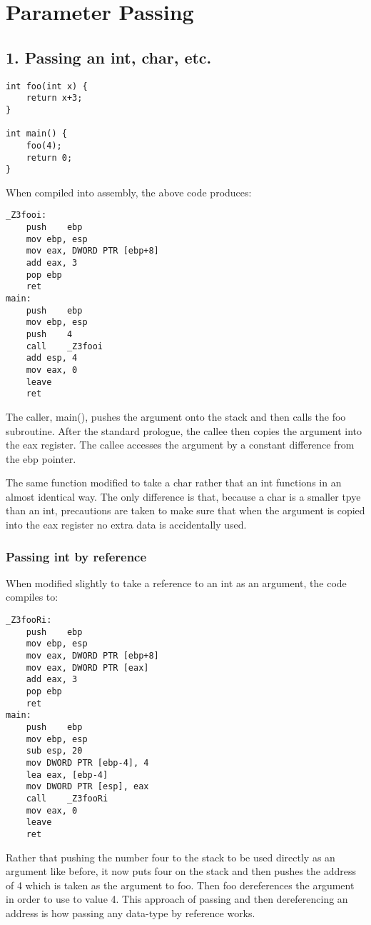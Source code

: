 \documentclass{article}
\begin{document}
\section*{Parameter Passing}
\subsection*{1. Passing an int, char, etc.}
\begin{lstlisting}
int foo(int x) {
    return x+3;
}

int main() {
    foo(4);
    return 0;
}
\end{lstlisting}
When compiled into assembly, the above code produces:
\begin{lstlisting}
_Z3fooi:
	push	ebp
	mov	ebp, esp
	mov	eax, DWORD PTR [ebp+8]
	add	eax, 3
	pop	ebp
	ret
main:
	push	ebp
	mov	ebp, esp
	push	4
	call	_Z3fooi
	add	esp, 4
	mov	eax, 0
	leave
	ret
\end{lstlisting}
The caller, main(), pushes the argument onto the stack and then calls the foo subroutine. After the standard prologue, the callee then copies the argument into the eax register. The callee accesses the argument by a constant difference from the ebp pointer.

The same function modified to take a char rather that an int functions in an almost identical way. The only difference is that, because a char is a smaller tpye than an int, precautions are taken to make sure that when the argument is copied into the eax register no extra data is accidentally used. 

\subsubsection*{Passing int by reference}
When modified slightly to take a reference to an int as an argument, the code compiles to:
\begin{lstlisting}
_Z3fooRi:
	push	ebp
	mov	ebp, esp
	mov	eax, DWORD PTR [ebp+8]
	mov	eax, DWORD PTR [eax]
	add	eax, 3
	pop	ebp
	ret
main:
	push	ebp
	mov	ebp, esp
	sub	esp, 20
	mov	DWORD PTR [ebp-4], 4
	lea	eax, [ebp-4]
	mov	DWORD PTR [esp], eax
	call	_Z3fooRi
	mov	eax, 0
	leave
	ret
\end{lstlisting}
Rather that pushing the number four to the stack to be used directly as an argument like before, it now puts four on the stack and then pushes the address of 4 which is taken as the argument to foo. Then foo dereferences the argument in order to use to value 4. This approach of passing and then dereferencing an address is how passing any data-type by reference works.
\end{document}
